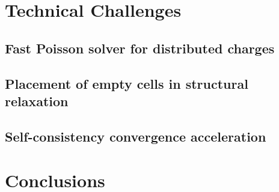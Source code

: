 \documentclass{llncs}
\begin{document}


\section{Technical Challenges} \label{section:tech}

\subsection{Fast Poisson solver for distributed charges} %

\subsection{Placement of empty cells in structural relaxation} %

\subsection{Self-consistency convergence acceleration} %


\section{Conclusions}\label{section:summary}
\end{document}
